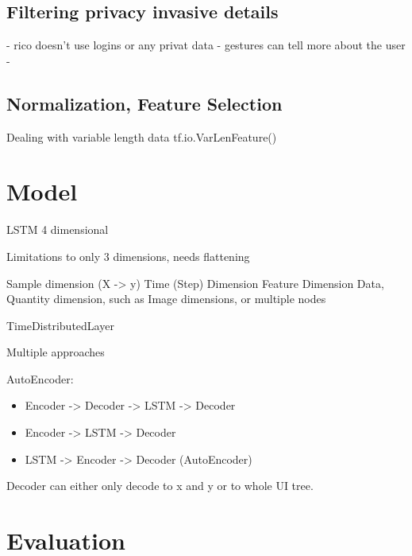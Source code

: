\subsection{Filtering privacy invasive details}

- rico doesn't use logins or any privat data
- gestures can tell more about the user
-


\subsection{Normalization, Feature Selection}

Dealing with variable length data tf.io.VarLenFeature()

\section{Model}


LSTM 4 dimensional

Limitations to only 3 dimensions, needs flattening

Sample dimension (X -> y)
Time (Step) Dimension
Feature Dimension
Data, Quantity dimension, such as Image dimensions, or multiple nodes

TimeDistributedLayer


Multiple approaches


AutoEncoder:

\begin{itemize}
  \item Encoder -> Decoder -> LSTM -> Decoder
  \item Encoder -> LSTM -> Decoder
  \item LSTM -> Encoder -> Decoder (AutoEncoder)
\end{itemize}

Decoder can either only decode to x and y or to whole UI tree.

\section{Evaluation}

